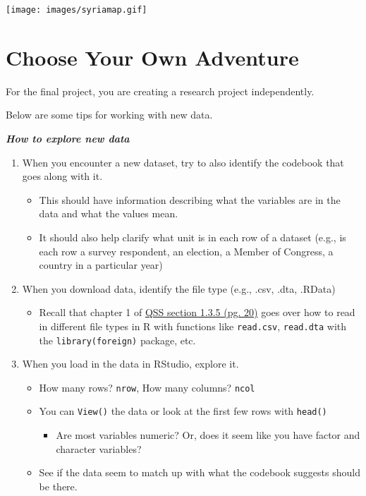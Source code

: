 \documentclass[
  letterpaper,
  DIV=11,
  numbers=noendperiod]{scrreprt}
\providecommand{\tightlist}{%
  \setlength{\itemsep}{0pt}\setlength{\parskip}{0pt}}\usepackage{longtable,booktabs,array}
\begin{document}
\texttt{[image: images/syriamap.gif]}


\hypertarget{choose}{%
\chapter{Choose Your Own Adventure}\label{choose}}

For the final project, you are creating a research project
independently.

Below are some tips for working with new data.

\textbf{\emph{How to explore new data}}

\begin{enumerate}
\def\labelenumi{\arabic{enumi}.}
\tightlist
\item
  When you encounter a new dataset, try to also identify the codebook
  that goes along with it.

  \begin{itemize}
  \tightlist
  \item
    This should have information describing what the variables are in
    the data and what the values mean.
  \item
    It should also help clarify what unit is in each row of a dataset
    (e.g., is each row a survey respondent, an election, a Member of
    Congress, a country in a particular year)
  \end{itemize}
\item
  When you download data, identify the file type (e.g., .csv, .dta,
  .RData)

  \begin{itemize}
  \tightlist
  \item
    Recall that chapter 1 of
    \href{https://assets.press.princeton.edu/chapters/s11025.pdf}{QSS
    section 1.3.5 (pg. 20)} goes over how to read in different file
    types in R with functions like \texttt{read.csv}, \texttt{read.dta}
    with the \texttt{library(foreign)} package, etc.
  \end{itemize}
\item
  When you load in the data in RStudio, explore it.

  \begin{itemize}
  \tightlist
  \item
    How many rows? \texttt{nrow}, How many columns? \texttt{ncol}
  \item
    You can \texttt{View()} the data or look at the first few rows with
    \texttt{head()}

    \begin{itemize}
    \tightlist
    \item
      Are most variables numeric? Or, does it seem like you have factor
      and character variables?
    \end{itemize}
  \item
    See if the data seem to match up with what the codebook suggests
    should be there.
  \end{itemize}
\end{enumerate}
\end{document}

